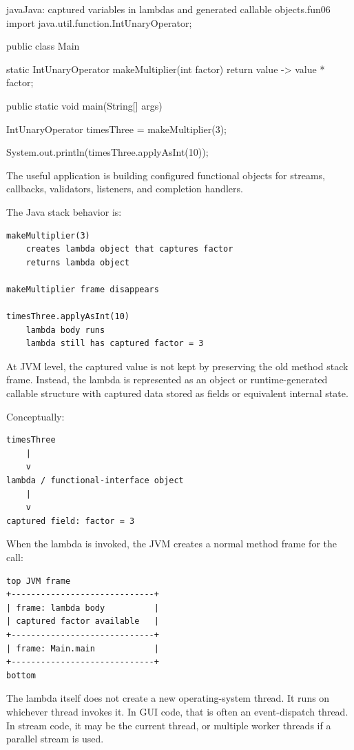 \begin{codebox}[]{java}{Java: captured variables in lambdas and generated callable objects.}{fun06}
import java.util.function.IntUnaryOperator;

public class Main {
    static IntUnaryOperator makeMultiplier(int factor) {
        return value -> value * factor;
    }

    public static void main(String[] args) {
        IntUnaryOperator timesThree = makeMultiplier(3);

        System.out.println(timesThree.applyAsInt(10));
    }
}
\end{codebox}


The useful application is building configured functional objects for streams, callbacks, validators, listeners, and completion handlers.

The Java stack behavior is:

\begin{verbatim}
makeMultiplier(3)
    creates lambda object that captures factor
    returns lambda object

makeMultiplier frame disappears

timesThree.applyAsInt(10)
    lambda body runs
    lambda still has captured factor = 3
\end{verbatim}

At JVM level, the captured value is not kept by preserving the old method stack frame. Instead, the lambda is represented as an object or runtime-generated callable structure with captured data stored as fields or equivalent internal state.

Conceptually:

\begin{verbatim}
timesThree
    |
    v
lambda / functional-interface object
    |
    v
captured field: factor = 3
\end{verbatim}

When the lambda is invoked, the JVM creates a normal method frame for the call:

\begin{verbatim}
top JVM frame
+-----------------------------+
| frame: lambda body          |
| captured factor available   |
+-----------------------------+
| frame: Main.main            |
+-----------------------------+
bottom
\end{verbatim}

The lambda itself does not create a new operating-system thread. It runs on whichever thread invokes it. In GUI code, that is often an event-dispatch thread. In stream code, it may be the current thread, or multiple worker threads if a parallel stream is used.

